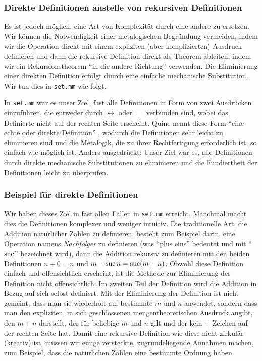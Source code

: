 \subsubsection{Direkte Definitionen anstelle von rekursiven Definitionen}

Es ist jedoch möglich, eine Art von Komplexität durch eine andere zu ersetzen.  Wir können die Notwendigkeit einer metalogischen Begründung vermeiden, indem wir die Operation direkt mit einem expliziten (aber komplizierten) Ausdruck definieren und dann die rekursive Definition direkt als Theorem ableiten, indem wir ein Rekursionstheorem "`in die andere Richtung"' verwenden. Die Eliminierung einer direkten Definition erfolgt diurch eine einfache mechanische Substitution. Wir tun dies in \texttt{set.mm} wie folgt.

In \texttt{set.mm} war es unser Ziel, fast alle Definitionen in Form von zwei Ausdrücken einzuführen, die entweder durch $\leftrightarrow$ oder $=$ verbunden sind, wobei das Definierte nicht auf der rechten Seite erscheint.  Quine nennt diese Form "`eine echte oder direkte Definition"' \cite[S. 174]{Quine}, wodurch die Definitionen sehr leicht zu eliminieren sind und die Metalogik, die zu ihrer Rechtfertigung erforderlich ist, so einfach wie möglich ist. Anders ausgedrückt: Unser Ziel war es, alle Definitionen durch direkte mechanische Substitutionen zu eliminieren und die Fundiertheit der Definitionen leicht zu überprüfen. 

\subsubsection{Beispiel für direkte Definitionen}

Wir haben dieses Ziel in fast allen Fällen in \texttt{set.mm} erreicht. Manchmal macht dies die Definitionen komplexer und weniger intuitiv. Die traditionelle Art, die Addition natürlicher Zahlen zu definieren, besteht zum Beispiel darin, eine Operation namens {\em Nachfolger} zu definieren (was "`plus eins"' bedeutet und mit "`${\rm suc}$"' bezeichnet wird), dann die Addition rekursiv zu definieren mit den beiden Definitionen $n + 0 = n$ und $m + {\rm suc}\,n = {\rm suc} (m + n)$.  Obwohl diese Definition einfach und offensichtlich erscheint, ist die Methode zur Eliminierung der Definition nicht offensichtlich: Im zweiten Teil der Definition wird die Addition in Bezug auf sich selbst definiert.  Mit der Eliminierung der Definition ist nicht gemeint, dass man sie wiederholt auf bestimmte $m$ und $n$ anwendet, sondern dass man den expliziten, in sich geschlossenen mengentheoretischen Ausdruck angibt, den $m + n$ darstellt, der für beliebige $m$ und $n$ gilt und der kein $+$-Zeichen auf der rechten Seite hat.  Damit eine rekursive Definition wie diese nicht zirkulär (kreativ) ist, müssen wir einige versteckte, zugrundeliegende Annahmen machen, zum Beispiel, dass die natürlichen Zahlen eine bestimmte Ordnung haben. 

